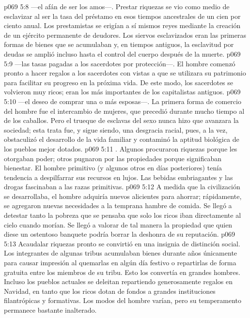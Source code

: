\vs p069 5:8  ---el afán de ser los amos---. Prestar riquezas se vio como medio de esclavizar al ser la tasa del préstamo en esos tiempos ancestrales de un cien por ciento anual. Los prestamistas se erigían a sí mismos reyes mediante la creación de un ejército permanente de deudores. Los siervos esclavizados eran las primeras formas de bienes que se acumulaban y, en tiempos antiguos, la esclavitud por deudas se amplió incluso hasta el control del cuerpo después de la muerte.
\vs p069 5:9  ---las tasas pagadas a los sacerdotes por protección---. El hombre comenzó pronto a hacer regalos a los sacerdotes con vistas a que se utilizara su patrimonio para facilitar su progreso en la próxima vida. De este modo, los sacerdotes se volvieron muy ricos; eran los más importantes de los capitalistas antiguos.
\vs p069 5:10  ---el deseo de comprar una o más esposas---. La primera forma de comercio del hombre fue el intercambio de mujeres, que precedió durante mucho tiempo al de los caballos. Pero el trueque de esclavas del sexo nunca hizo que avanzara la sociedad; esta trata fue, y sigue siendo, una desgracia racial, pues, a la vez, obstaculizó el desarrollo de la vida familiar y contaminó la aptitud biológica de los pueblos mejor dotados.
\vs p069 5:11 . Algunos procuraron riquezas porque les otorgaban poder; otros pugnaron por las propiedades porque significaban bienestar. El hombre primitivo (y algunos otros en días posteriores) tenía tendencia a despilfarrar sus recursos en lujos. Las bebidas embriagantes y las drogas fascinaban a las razas primitivas.
\vs p069 5:12 \pc A medida que la civilización se desarrollaba, el hombre adquiría nuevos alicientes para ahorrar; rápidamente, se agregaron nuevas necesidades a la temprana hambre de comida. Se llegó a detestar tanto la pobreza que se pensaba que solo los ricos iban directamente al cielo cuando morían. Se llegó a valorar de tal manera la propiedad que quien diese un ostentoso banquete podría borrar la deshonra de su reputación.
\vs p069 5:13 Acaudalar riquezas pronto se convirtió en una insignia de distinción social. Los integrantes de algunas tribus acumulaban bienes durante años únicamente para causar impresión al quemarlas en algún día festivo o repartirlas de forma gratuita entre los miembros de su tribu. Esto los convertía en grandes hombres. Incluso los pueblos actuales se deleitan repartiendo generosamente regalos en Navidad, en tanto que los ricos dotan de fondos a grandes instituciones filantrópicas y formativas. Los modos del hombre varían, pero su temperamento permanece bastante inalterado.
